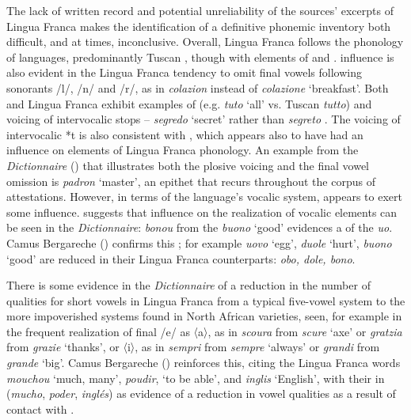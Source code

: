 \documentclass[output=paper]{langsci/langscibook}
\begin{document}
	The  lack of written record and potential unreliability of the sources’ excerpts of Lingua Franca makes the identification of a definitive phonemic inventory both difficult, and at times, inconclusive. Overall, Lingua Franca follows the phonology of  languages, predominantly Tuscan , though with elements of  and .  influence is also evident in the Lingua Franca tendency to omit final vowels following sonorants /l/, /n/ and /r/, as in \textit{colazion} instead of \textit{colazione} ‘breakfast’. Both  and Lingua Franca exhibit examples of  (e.g. \textit{tuto} `all' vs. Tuscan \textit{tutto}) and voicing of intervocalic stops – \textit{segredo} `secret' rather than \textit{segreto} \citep{Ursini2011}. The voicing of intervocalic *t is also consistent with , which appears also to have had an influence on elements of Lingua Franca phonology. An example from the \textit{Dictionnaire} (\citeyear[63]{Anonymous1830}) that illustrates both the plosive voicing and the final vowel omission is \textit{padron} ‘master’, an epithet that recurs throughout the corpus of attestations. However, in terms of the language’s vocalic system,  appears to exert some influence. \citet{Cifoletti2004} suggests that  influence on the realization of vocalic elements can be seen in the \textit{Dictionnaire}: \textit{bonou} from the  \textit{buono} ‘good’ evidences a  of the  \textit{uo}. Camus Bergareche (\citeyear[444]{Bergareche1993}) confirms this ; for example  \textit{uovo} ‘egg’, \textit{duole} ‘hurt’, \textit{buono} ‘good’ are reduced in their Lingua Franca counterparts: \textit{obo, dole, bono}. 
	
	There is some evidence in the \textit{Dictionnaire} of a reduction in the number of qualities for short vowels in Lingua Franca from a typical five-vowel  system to the more impoverished systems found in North African  varieties, seen, for example in the frequent realization of final /e/ as 〈a〉, as in \textit{scoura} from \textit{scure} ‘axe’ or \textit{gratzia} from \textit{grazie} ‘thanks’, or 〈i〉, as in \textit{sempri} from \textit{sempre} ‘always’ or \textit{grandi} from \textit{grande} ‘big’. Camus Bergareche (\citeyear[444]{Bergareche1993}) reinforces this, citing the Lingua Franca words \textit{mouchou} ‘much, many’, \textit{poudir}, ‘to be able’, and \textit{inglis} ‘English’, with their  in  (\textit{mucho}, \textit{poder}, \textit{inglés}) as evidence of a reduction in vowel qualities as a result of contact with . 
	
\end{document}
